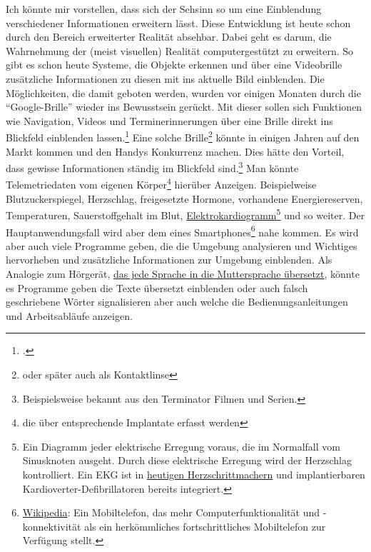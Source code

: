 Ich könnte mir vorstellen, dass sich der Sehsinn so um eine Einblendung verschiedener Informationen
erweitern lässt. Diese Entwicklung ist heute schon durch den Bereich erweiterter Realität absehbar.
Dabei geht es darum, die Wahrnehmung der (meist visuellen) Realität computergestützt zu erweitern. So
gibt es schon heute Systeme, die Objekte erkennen und über eine Videobrille zusätzliche Informationen
zu diesen mit ins aktuelle Bild einblenden. Die Möglichkeiten, die damit geboten werden, wurden vor
einigen Monaten durch die \enquote{Google-Brille} wieder ins Bewusstsein
gerückt. Mit dieser sollen sich Funktionen wie Navigation, Videos und Terminerinnerungen über eine
Brille direkt ins Blickfeld einblenden lassen.\footcite{Heise:TR:Project_Glass}
Eine solche Brille\footnote{oder später auch als
Kontaktlinse} könnte in einigen Jahren auf den Markt kommen und den Handys Konkurrenz machen. Dies
hätte den Vorteil, dass gewisse Informationen ständig im Blickfeld sind.\footnote{Beispielsweise
bekannt aus den Terminator Filmen und Serien.} Man könnte Telemetriedaten vom eigenen
Körper\footnote{die über entsprechende Implantate erfasst werden}
hierüber Anzeigen. Beispielweise Blutzuckerspiegel, Herzschlag, freigesetzte Hormone, vorhandene
Energiereserven, Temperaturen, Sauerstoffgehalt im Blut,
\href{http://de.wikipedia.org/wiki/Elektrokardiogramm}{Elektrokardiogramm}\footnote{%
Ein Diagramm jeder elektrische Erregung voraus, die im
Normalfall vom Sinusknoten ausgeht. Durch diese elektrische Erregung wird der Herzschlag
kontrolliert. Ein EKG ist in \hyperref[sec:Robin:topical:Pacemaker]{heutigen Herzschrittmachern}
und implantierbaren Kardioverter-Defibrillatoren
bereits integriert.} und so weiter.
Der Hauptanwendungsfall wird aber dem eines
Smartphones\footnote{\href{http://de.wikipedia.org/wiki/Smartphone}{Wikipedia}: Ein Mobiltelefon, das
mehr Computerfunktionalität und -konnektivität als ein herkömmliches fortschrittliches Mobiltelefon
zur Verfügung stellt.} nahe kommen. Es wird aber auch viele Programme geben, die die Umgebung
analysieren und Wichtiges hervorheben und zusätzliche Informationen zur Umgebung einblenden. Als
Analogie zum Hörgerät, \hyperref[sec:Robin:future:hearing:Babel_Fish]{das jede Sprache in die
Muttersprache übersetzt}, könnte es Programme geben die Texte übersetzt einblenden oder auch falsch
geschriebene Wörter signalisieren aber auch welche die Bedienungsanleitungen und Arbeitsabläufe
anzeigen.

